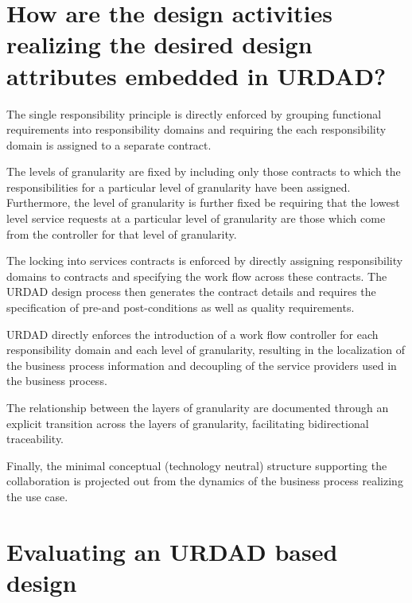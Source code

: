\documentclass{IOS-Book-Article}
\begin{document}

\section{How are the design activities realizing the desired design attributes embedded in URDAD?}

The single responsibility principle is directly enforced by grouping functional requirements into responsibility
domains and requiring the each responsibility domain is assigned to a separate contract.

The levels of granularity are fixed by including only those contracts to which the responsibilities for a
particular level of granularity have been assigned. Furthermore, the level of granularity is further fixed
be requiring that the lowest level service requests at a particular level of granularity are those which
come from the controller for that level of granularity.

The locking into services contracts is enforced by directly assigning responsibility domains to contracts and
specifying the work flow across these contracts. The URDAD design process then generates the 
contract details and requires the specification of pre-and post-conditions as well as quality requirements.

URDAD directly enforces the introduction of a work flow controller for each responsibility domain and
each level of granularity, resulting in the localization of the business process information and decoupling
of the service providers used in the business process.

The relationship between the layers of granularity are documented through an explicit transition across
the layers of granularity, facilitating bidirectional traceability.

Finally, the minimal conceptual (technology neutral) structure supporting the collaboration is projected out
from the dynamics of the business process realizing the use case.


\section{Evaluating an URDAD based design}
\end{document}
